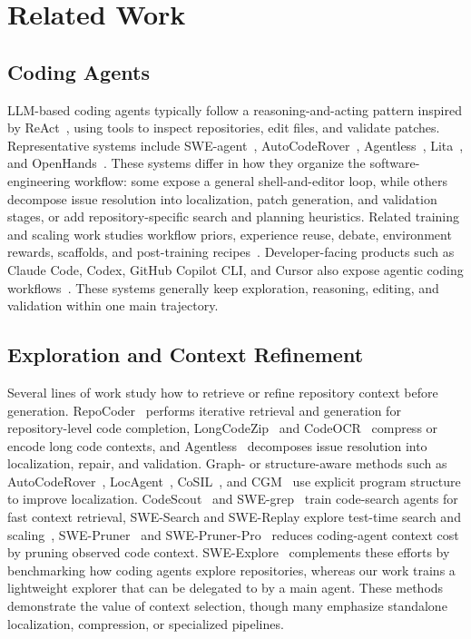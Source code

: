 \documentclass[11pt]{article}
\begin{document}
\section{Related Work}
\label{sec:related}

\subsection{Coding Agents}

LLM-based coding agents typically follow a reasoning-and-acting pattern inspired by ReAct~\cite{react}, using tools to inspect repositories, edit files, and validate patches.
Representative systems include SWE-agent~\cite{sweagent}, AutoCodeRover~\cite{autocoderover}, Agentless~\cite{agentless}, Lita~\cite{lita}, and OpenHands~\cite{openhands}.
These systems differ in how they organize the software-engineering workflow: some expose a general shell-and-editor loop, while others decompose issue resolution into localization, patch generation, and validation stages, or add repository-specific search and planning heuristics.
Related training and scaling work studies workflow priors, experience reuse, debate, environment rewards, scaffolds, and post-training recipes~\cite{kimidev, swefixer, swegym, sweexp, swedebate, agentrlvr, slime_github, hyperagent, sweprotege, sweworld, swemaster}.
Developer-facing products such as Claude Code, Codex, GitHub Copilot CLI, and Cursor also expose agentic coding workflows~\cite{claudecode, openaicodex, githubcopilotcli, cursor}.
These systems generally keep exploration, reasoning, editing, and validation within one main trajectory.


\subsection{Exploration and Context Refinement}
Several lines of work study how to retrieve or refine repository context before generation.
RepoCoder~\cite{repocoder} performs iterative retrieval and generation for repository-level code completion, LongCodeZip~\cite{longcodezip} and CodeOCR~\cite{codeocr} compress or encode long code contexts, and Agentless~\cite{agentless} decomposes issue resolution into localization, repair, and validation.
Graph- or structure-aware methods such as AutoCodeRover~\cite{autocoderover}, LocAgent~\cite{locagent}, CoSIL~\cite{cosil}, and CGM~\cite{cgm} use explicit program structure to improve localization.
CodeScout~\cite{codescout} and SWE-grep~\cite{swegrep} train code-search agents for fast context retrieval, SWE-Search and SWE-Replay explore test-time search and scaling~\cite{swesearch, swereplay}, SWE-Pruner~\cite{swepruner} and SWE-Pruner-Pro~\cite{sweprunerpro} reduces coding-agent context cost by pruning observed code context.
SWE-Explore~\cite{sweexplore} complements these efforts by benchmarking how coding agents explore repositories, whereas our work trains a lightweight explorer that can be delegated to by a main agent.
These methods demonstrate the value of context selection, though many emphasize standalone localization, compression, or specialized pipelines.
\end{document}
